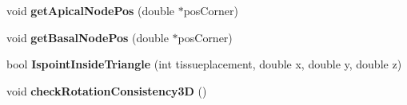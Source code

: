 \begin{DoxyCompactItemize}
\item 
\hypertarget{classPrism_a243934a73a8f198ed592761ecb0927b9}{}void {\bfseries get\+Apical\+Node\+Pos} (double $\ast$pos\+Corner)\label{classPrism_a243934a73a8f198ed592761ecb0927b9}

\item 
\hypertarget{classPrism_a31324d23b37fa20911916ebb7ee1064d}{}void {\bfseries get\+Basal\+Node\+Pos} (double $\ast$pos\+Corner)\label{classPrism_a31324d23b37fa20911916ebb7ee1064d}

\item 
\hypertarget{classPrism_a26bb1eed04307a373ba87b48f1c1a3ca}{}bool {\bfseries Ispoint\+Inside\+Triangle} (int tissueplacement, double x, double y, double z)\label{classPrism_a26bb1eed04307a373ba87b48f1c1a3ca}

\item 
\hypertarget{classPrism_a85f9b472a3310e76ab0c76bd1fb7dd30}{}void {\bfseries check\+Rotation\+Consistency3\+D} ()\label{classPrism_a85f9b472a3310e76ab0c76bd1fb7dd30}

\end{DoxyCompactItemize}

